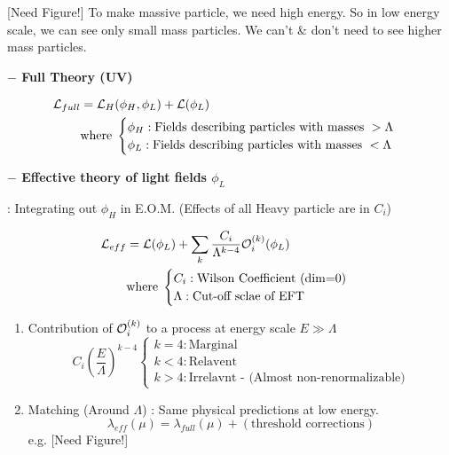 \documentclass[11pt,letterpaper]{article}
\begin{document}
[Need Figure!] To make massive particle, we need high energy. So in low energy scale, we can see only small mass particles.
We can't \& don't need to see higher mass particles. 

\VS

{\bfseries $-$ Full Theory (UV)}

\begin{equation}
\begin{aligned}
	\mathcal{L}_{full} &= \mathcal{L}_{H}(\phi_H, \phi_L) + \mathcal{L}(\phi_L) \\
	&\text{where} \hspace{0.1cm} 
	\begin{cases}
		\phi_H : \text{Fields describing particles with masses } >  \Lambda \\
		\phi_L : \text{Fields describing particles with masses }  < \Lambda
	\end{cases}
\end{aligned}
\end{equation}

\vs

{\bfseries $-$ Effective theory of light fields $\phi_L$}

\quad : Integrating out $\phi_H$ in E.O.M. (Effects of all Heavy particle are in $C_i$)

\begin{equation}
\begin{aligned}
	\mathcal{L}_{eff} &= \mathcal{L}(\phi_L) + \sum_{k} \frac{C_i}{\Lambda^{k-4}}\mathcal{O}_i^{(k)} (\phi_L) \\
	&\text{where} \hspace{0.1cm}
	\begin{cases}
		C_i : \text{Wilson Coefficient (dim=0)} \\
		\Lambda : \text{Cut-off sclae of EFT}
	\end{cases}
\end{aligned}
\end{equation}

\begin{enumerate}[(1)]
	\item Contribution of $\mathcal{O}_i^{(k)}$ to a process at energy scale $E \gg \Lambda$ \newline
	$$C_i\left( \frac{E}{\Lambda} \right)^{k-4}
	\begin{cases}
		k = 4 : \text{Marginal} \\
		k<4 : \text{Relavent} \\
		k>4 : \text{Irrelavnt - (Almost non-renormalizable)}
	\end{cases}
	$$
	\item Matching (Around $\Lambda$) : Same physical predictions at low energy. \newline
	$$
	\lambda_{eff}(\mu)  = \lambda_{full}(\mu) + (\text{threshold corrections})
	$$ \newline
	e.g. [Need Figure!]
\end{enumerate}
\end{document}
